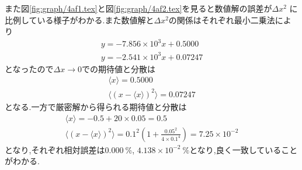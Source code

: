 また図\ref{fig:graph/4af1.tex}と図\ref{fig:graph/4af2.tex}を見ると数値解の誤差が$\Delta x^2$
に比例している様子がわかる.また数値解と$\Delta x^2$の関係はそれぞれ最小二乗法により
\begin{align}
  y=-7.856\times10^3x+0.5000\\
  y=-2.541\times10^3x+0.07247
\end{align}
となったので$\Delta x\rightarrow 0$での期待値と分散は
\begin{align}
  \langle x\rangle=0.5000\\
  \langle (x-\langle x\rangle)^2\rangle=0.07247
\end{align}
となる.一方で厳密解から得られる期待値と分散は
\begin{align}
  \langle x\rangle=-0.5+20\times0.05=0.5\\
  \langle (x-\langle x\rangle)^2\rangle=0.1^2\left(1+\frac{0.05^2}{4\times0.1^4}\right)=7.25\times10^{-2}
\end{align}
となり,それぞれ相対誤差は$0.000\ \%$, $4.138\times10^{-2}\ \%$となり,良く一致していることがわかる.